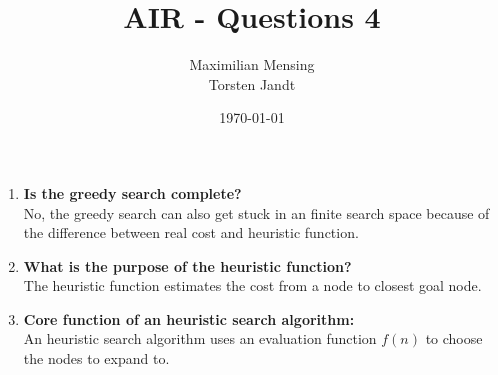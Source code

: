 \documentclass[a4paper,headsepline,12pt]{scrartcl}
\title{AIR - Questions 4}
\date{\today}
\author{Maximilian Mensing\\Torsten Jandt}
\begin{document}
\maketitle

\begin{enumerate}
    \item \textbf{Is the greedy search complete?} \\
    	No, the greedy search can also get stuck in an finite search space because of the difference between real cost and heuristic function.
    \item \textbf{What is the purpose of the heuristic function?} \\
    	The heuristic function estimates the cost from a node to closest goal node.
    \item \textbf{Core function of an heuristic search algorithm:} \\
    	An heuristic search algorithm uses an evaluation function $f(n)$ to choose the nodes to expand to.
\end{enumerate}
\end{document}
